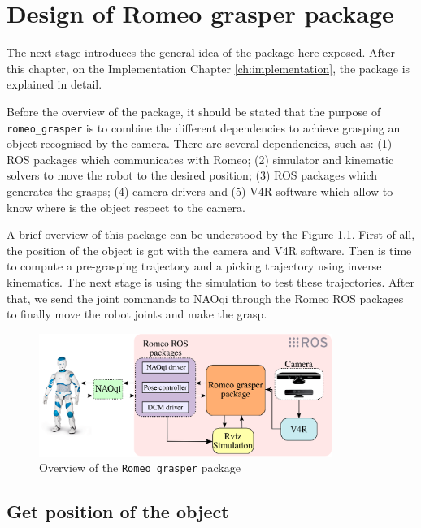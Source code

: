 \documentclass[12pt,a4paper,final,twoside,openright]{report}
\begin{document}
\chapter{Design of Romeo grasper package}
\label{cha:design}

The next stage introduces the general idea of the package here exposed. After this chapter, on the Implementation Chapter \ref{ch:implementation}, the package is explained in detail. 

Before the overview of the package, it should be stated that the purpose of \texttt{romeo\_grasper} is to combine the different dependencies to achieve grasping an object recognised by the camera. There are several dependencies, such as: (1) ROS packages which communicates with Romeo; (2) simulator and kinematic solvers to move the robot to the desired position; (3) ROS packages which generates the grasps; (4) camera drivers and (5) V4R software which allow to know where is the object respect to the camera.

A brief overview of this package can be understood by the Figure \ref{fig:overview_design}. First of all, the position of the object is got with the camera and V4R software. Then is time to compute a pre-grasping trajectory and a picking trajectory using inverse kinematics. The next stage is using the simulation to test these trajectories. After that, we send the joint commands to NAOqi through the Romeo ROS packages to finally move the robot joints and make the grasp.


\begin{figure}[h]
\centering
\includegraphics[width=0.85\textwidth]{images/package_design.eps}
\caption{Overview of the \texttt{Romeo grasper} package \label{fig:overview_design}}
\end{figure}

\section{Get position of the object}
\end{document}
